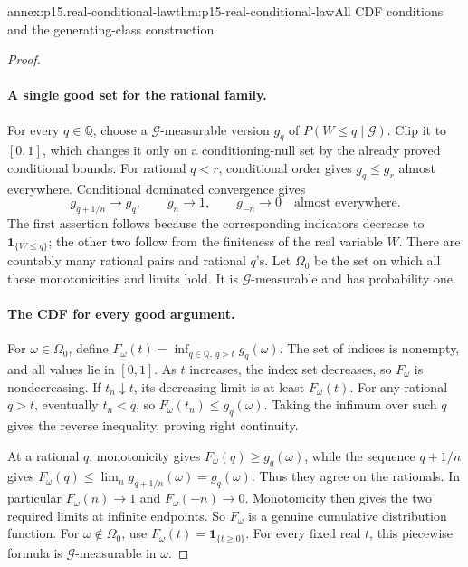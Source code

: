 \begin{annexitem}{annex:p15.real-conditional-law}{thm:p15-real-conditional-law}{All CDF conditions and the generating-class construction}
\begin{proof}
\paragraph{A single good set for the rational family.}
For every \(q\in\mathbb Q\), choose a \(\mathcal G\)-measurable
version \(g_q\) of \(P(W\leq q\mid\mathcal G)\).
Clip it to \([0,1]\), which changes it only on a conditioning-null
set by the already proved conditional bounds.
For rational \(q<r\), conditional order gives \(g_q\leq g_r\)
almost everywhere. Conditional dominated convergence gives
\[
 g_{q+1/n}\longrightarrow g_q,\qquad
 g_n\longrightarrow1,\qquad g_{-n}\longrightarrow0
                         \quad\text{almost everywhere}.
\]
The first assertion follows because the corresponding indicators
decrease to \(\mathbf1_{\{W\leq q\}}\); the other two follow
from the finiteness of the real variable \(W\).
There are countably many rational pairs and rational \(q\)'s.
Let \(\Omega_0\) be the set on which all these monotonicities
and limits hold. It is \(\mathcal G\)-measurable and has probability one.

\paragraph{The CDF for every good argument.}
For \(\omega\in\Omega_0\), define
\(F_\omega(t)=\inf_{q\in\mathbb Q,\ q>t}g_q(\omega)\).
The set of indices is nonempty, and all values lie in \([0,1]\).
As \(t\) increases, the index set decreases, so \(F_\omega\)
is nondecreasing. If \(t_n\downarrow t\), its decreasing limit
is at least \(F_\omega(t)\).
For any rational \(q>t\), eventually \(t_n<q\), so
\(F_\omega(t_n)\leq g_q(\omega)\).
Taking the infimum over such \(q\) gives the reverse inequality,
proving right continuity.

At a rational \(q\), monotonicity gives \(F_\omega(q)\geq g_q(\omega)\),
while the sequence \(q+1/n\) gives
\(F_\omega(q)\leq\lim_n g_{q+1/n}(\omega)=g_q(\omega)\).
Thus they agree on the rationals. In particular
\(F_\omega(n)\to1\) and \(F_\omega(-n)\to0\).
Monotonicity then gives the two required limits at infinite endpoints.
So \(F_\omega\) is a genuine cumulative distribution function.
For \(\omega\notin\Omega_0\), use \(F_\omega(t)=\mathbf1_{\{t\geq0\}}\).
For every fixed real \(t\), this piecewise formula is
\(\mathcal G\)-measurable in \(\omega\).


\end{proof}
\end{annexitem}
